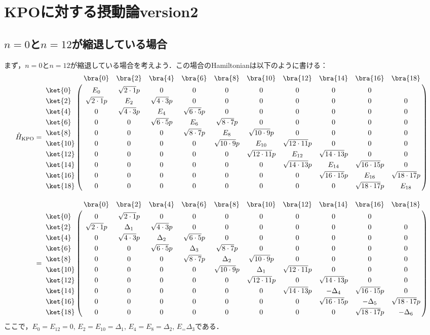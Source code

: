 

\section{KPOに対する摂動論version2}
\subsection{$n=0$と$n=12$が縮退している場合}
まず，$n=0$と$n=12$が縮退している場合を考えよう．この場合のHamiltonianは以下のように書ける：
\begin{align}
     \hat{H}_{\rm{KPO}}&=
   \bordermatrix{     
    & \bra{0} &  \bra{2} &  \bra{4}&  \bra{6}&  \bra{8} &\bra{10} &\bra{12}&\bra{14} &\bra{16}&\bra{18}\cr
   \ket{0}&E_0&\sqrt{2\cdot1}p&0&0&0&0&0&0&0\cr
  \ket{2}&\sqrt{2\cdot1}p&E_2&\sqrt{4\cdot3}p&0&0&0&0&0&0&0\cr
  \ket{4}&0&\sqrt{4\cdot3}p&E_4&\sqrt{6\cdot5}p&0&0&0&0&0&0\cr
  \ket{6}&0&0&\sqrt{6\cdot5}p&E_6&\sqrt{8\cdot7}p&0&0&0&0&0\cr
  \ket{8}&0&0&0&\sqrt{8\cdot7}p&E_8&\sqrt{10\cdot9}p&0&0&0&0\cr
  \ket{10}&0&0&0&0&\sqrt{10\cdot9}p&E_{10}&\sqrt{12\cdot11}p&0&0&0\cr
  \ket{12}&0&0&0&0&0&\sqrt{12\cdot11}p&E_{12}&\sqrt{14\cdot13}p&0&0\cr
  \ket{14}&0&0&0&0&0&0&\sqrt{14\cdot13}p&E_{14}&\sqrt{16\cdot15}p&0\cr
  \ket{16}&0&0&0&0&0&0&0&\sqrt{16\cdot15}p&E_{16}&\sqrt{18\cdot17}p\cr
  \ket{18}&0&0&0&0&0&0&0&0&\sqrt{18\cdot17}p&E_{18}\cr
            }\\[10pt]
    &=
   \bordermatrix{     
    & \bra{0} &  \bra{2} &  \bra{4}&  \bra{6}&  \bra{8} &\bra{10} &\bra{12}&\bra{14} &\bra{16}&\bra{18}\cr
   \ket{0}&0&\sqrt{2\cdot1}p&0&0&0&0&0&0&0\cr
  \ket{2}&\sqrt{2\cdot1}p&\Delta_1&\sqrt{4\cdot3}p&0&0&0&0&0&0&0\cr
  \ket{4}&0&\sqrt{4\cdot3}p&\Delta_2&\sqrt{6\cdot5}p&0&0&0&0&0&0\cr
  \ket{6}&0&0&\sqrt{6\cdot5}p&\Delta_3&\sqrt{8\cdot7}p&0&0&0&0&0\cr
  \ket{8}&0&0&0&\sqrt{8\cdot7}p&\Delta_2&\sqrt{10\cdot9}p&0&0&0&0\cr
  \ket{10}&0&0&0&0&\sqrt{10\cdot9}p&\Delta_1&\sqrt{12\cdot11}p&0&0&0\cr
  \ket{12}&0&0&0&0&0&\sqrt{12\cdot11}p&0&\sqrt{14\cdot13}p&0&0\cr
  \ket{14}&0&0&0&0&0&0&\sqrt{14\cdot13}p&-\Delta_4&\sqrt{16\cdot15}p&0\cr
  \ket{16}&0&0&0&0&0&0&0&\sqrt{16\cdot15}p&-\Delta_5&\sqrt{18\cdot17}p\cr
  \ket{18}&0&0&0&0&0&0&0&0&\sqrt{18\cdot17}p&-\Delta_6\cr
            }
\end{align}
ここで，$E_0=E_12=0$, $E_2=E_{10}=\Delta_1$, $E_4=E_{8}=\Delta_2$, $E_=\Delta_3$である．


